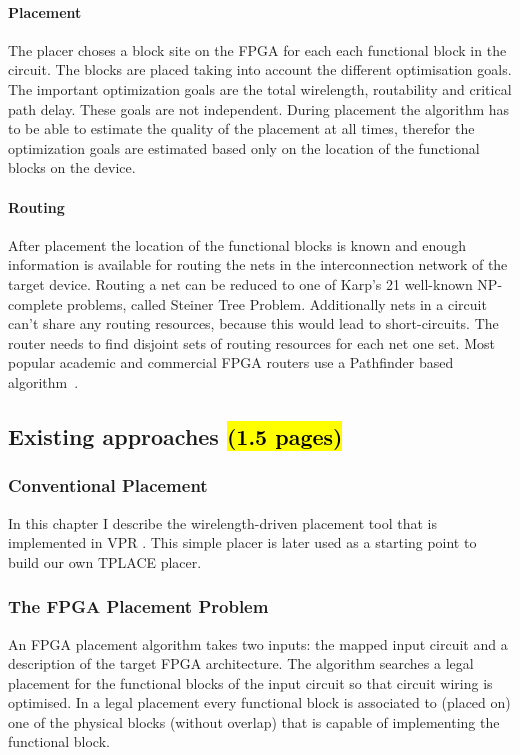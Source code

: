 \documentclass[a4paper,oneside,12pt]{article}
\begin{document}
\paragraph{Placement}
The placer choses a block site on the FPGA for each each functional block in the circuit. The blocks are placed taking into account the different optimisation goals. The important optimization goals are the total wirelength, routability and critical path delay. These goals are not independent. During placement the algorithm has to be able to estimate the quality of the placement at all times, therefor the optimization goals are estimated based only on the location of the functional blocks on the device. 

\paragraph{Routing} After placement the location of the functional blocks is known and enough information is available for routing the nets in the interconnection network of the target device. Routing a net can be reduced to  one of Karp's 21 well-known NP-complete problems, called Steiner Tree Problem. Additionally nets in a circuit can't share any routing resources, because this would lead to short-circuits. The router needs to find disjoint sets of routing resources for each net one set. Most popular academic and commercial FPGA routers use a Pathfinder based algorithm~\cite{pathfinder, vprBVRJ, vprboek}.

\subsection{Existing approaches \hl{(1.5 pages)}}

\subsubsection{Conventional Placement}
\label{sec:convPlace}
In this chapter I describe the wirelength-driven placement tool that is implemented in VPR \cite{betz1997vanppartffr,betz1999aacfdf}. This simple placer is later used as a starting point to build our own TPLACE placer. 

\subsubsection{The FPGA Placement Problem}
\label{sec:placeprob}
An FPGA placement algorithm takes two inputs: the mapped input circuit and a description of the target FPGA architecture. The algorithm searches a legal placement for the functional blocks of the input circuit so that circuit wiring is optimised. In a legal placement every functional block is associated to (placed on) one of the physical blocks (without overlap) that is capable of implementing the functional block. 
\end{document}
